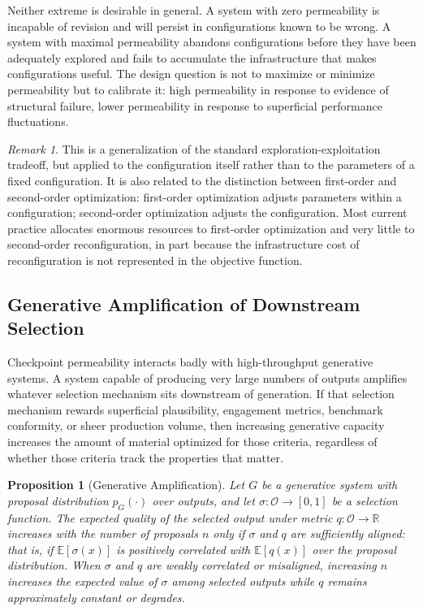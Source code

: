 \documentclass[12pt,a4paper]{article}
\theoremstyle{plain}
\newtheorem{proposition}[theorem]{Proposition}
\theoremstyle{definition}
\theoremstyle{remark}
\newtheorem{remark}[theorem]{Remark}
\begin{document}
Neither extreme is desirable in general. A system with zero permeability is incapable of revision and will persist in configurations known to be wrong. A system with maximal permeability abandons configurations before they have been adequately explored and fails to accumulate the infrastructure that makes configurations useful. The design question is not to maximize or minimize permeability but to calibrate it: high permeability in response to evidence of structural failure, lower permeability in response to superficial performance fluctuations.

\begin{remark}
This is a generalization of the standard exploration-exploitation tradeoff, but applied to the configuration itself rather than to the parameters of a fixed configuration. It is also related to the distinction between first-order and second-order optimization: first-order optimization adjusts parameters within a configuration; second-order optimization adjusts the configuration. Most current practice allocates enormous resources to first-order optimization and very little to second-order reconfiguration, in part because the infrastructure cost of reconfiguration is not represented in the objective function.
\end{remark}

\subsection{Generative Amplification of Downstream Selection}

Checkpoint permeability interacts badly with high-throughput generative systems. A system capable of producing very large numbers of outputs amplifies whatever selection mechanism sits downstream of generation. If that selection mechanism rewards superficial plausibility, engagement metrics, benchmark conformity, or sheer production volume, then increasing generative capacity increases the amount of material optimized for those criteria, regardless of whether those criteria track the properties that matter.

\begin{proposition}[Generative Amplification]
\label{prop:amplification}
Let $G$ be a generative system with proposal distribution $p_G(\cdot)$ over outputs, and let $\sigma: \mathcal{O} \to [0,1]$ be a selection function. The expected quality of the selected output under metric $q: \mathcal{O} \to \mathbb{R}$ increases with the number of proposals $n$ only if $\sigma$ and $q$ are sufficiently aligned: that is, if $\mathbb{E}[\sigma(x)]$ is positively correlated with $\mathbb{E}[q(x)]$ over the proposal distribution. When $\sigma$ and $q$ are weakly correlated or misaligned, increasing $n$ increases the expected value of $\sigma$ among selected outputs while $q$ remains approximately constant or degrades.
\end{proposition}
\end{document}
